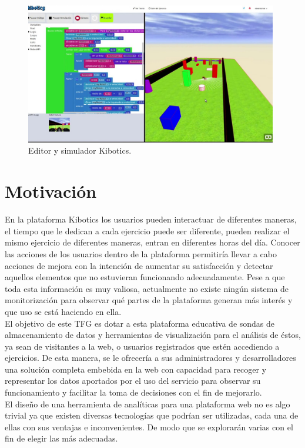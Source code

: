 \documentclass[a4paper, 12pt]{book}
\begin{document}
		\begin{figure}[H]
			\centering
			\includegraphics[width=11cm, keepaspectratio]{img/editor_simulador_kibotics.jpg}
			\caption{Editor y simulador Kibotics.}
			\label{fig:editor_simulador_kibotics}
		\end{figure}


	\section{Motivación}
	\label{sec:motivación}
		
		En la plataforma Kibotics los usuarios pueden interactuar de diferentes maneras, el tiempo que le dedican a cada ejercicio puede ser diferente, pueden realizar el mismo ejercicio de diferentes maneras, entran en diferentes horas del día. Conocer las acciones de los usuarios dentro de la plataforma permitiría llevar a cabo acciones de mejora con la intención de aumentar su satisfacción y detectar aquellos elementos que no estuvieran funcionando adecuadamente. Pese a que toda esta información es muy valiosa, actualmente no existe ningún sistema de monitorización para observar qué partes de la plataforma generan más interés y que uso se está haciendo en ella.  \\

		El objetivo de este TFG es dotar a esta plataforma educativa de sondas de almacenamiento de datos y herramientas de visualización para el análisis de éstos, ya sean de visitantes a la web, o usuarios registrados que estén accediendo a ejercicios. De esta manera, se le ofrecería a sus administradores y desarrolladores una solución completa embebida en la web con capacidad para recoger y representar los datos aportados por el uso del servicio para observar su funcionamiento y facilitar la toma de decisiones con el fin de mejorarlo. \\
			
		El diseño de una herramienta de analíticas para una plataforma web no es algo trivial ya que existen diversas tecnologías que podrían ser utilizadas, cada una de ellas con sus ventajas e inconvenientes. De modo que se explorarán varias con el fin de elegir las más adecuadas.
		
\end{document}
